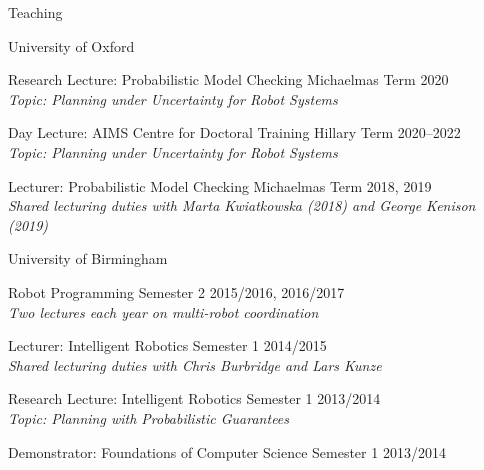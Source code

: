 
\begin{rSection}{Teaching}

\begin{rSubsection}{University of Oxford}{}{}{}
\item Research Lecture: Probabilistic Model Checking   \hfill Michaelmas Term 2020\\
\textit{Topic: Planning under Uncertainty for Robot Systems }
\item Day Lecture: AIMS Centre for Doctoral Training   \hfill Hillary Term 2020--2022\\
\textit{Topic: Planning under Uncertainty for Robot Systems }
\item Lecturer: Probabilistic Model Checking  \hfill Michaelmas Term 2018, 2019\\
\textit{Shared lecturing duties with Marta Kwiatkowska (2018) and George Kenison (2019)}
\end{rSubsection}

\begin{rSubsection}{University of Birmingham}{}{}{}
\item Robot Programming  \hfill Semester 2 2015/2016, 2016/2017\\
\textit{Two lectures each year on multi-robot coordination}
\item Lecturer: Intelligent Robotics \hfill Semester 1 2014/2015\\
\textit{Shared lecturing duties with Chris Burbridge and Lars Kunze}
\item Research Lecture: Intelligent Robotics \hfill Semester 1 2013/2014\\
\textit{Topic: Planning with Probabilistic Guarantees }
\item Demonstrator: Foundations of Computer Science \hfill Semester 1 2013/2014
\end{rSubsection}



\end{rSection}
